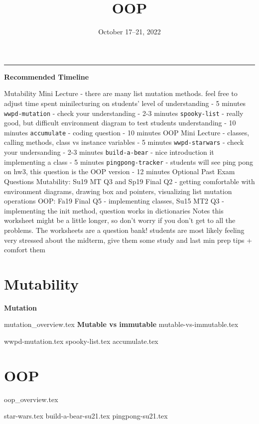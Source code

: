 \documentclass{exam}
\title{\textsc{OOP}}
\date{October 17--21, 2022}
\begin{document}
	\maketitle
	\rule{\textwidth}{0.15em}
	\fontsize{12}{15}\selectfont

\begin{guide}
	\textbf{Recommended Timeline}
	\begin{outline}[enumerate]
		\1 Mutability Mini Lecture - there are many list mutation methods. feel free to adjust time spent minilecturing on students' level of understanding - 5 minutes
		\1 \lstinline{wwpd-mutation} - check your understanding - 2-3 minutes
		\1 \lstinline{spooky-list} - really good, but difficult environment diagram to test students understanding - 10 minutes
		\1 \lstinline{accumulate} - coding question - 10 minutes
		\1 OOP Mini Lecture - classes, calling methods, class vs instance variables - 5 minutes
		\1 \lstinline{wwpd-starwars} - check your undersanding - 2-3 minutes
		\1 \lstinline{build-a-bear} - nice introduction it implementing a class - 5 minutes 
		\1 \lstinline{pingpong-tracker} - students will see ping pong on hw3, this question is the OOP version - 12 minutes
		\1 Optional Past Exam Questions
		\2 Mutability: Su19 MT Q3 and Sp19 Final Q2 - getting comfortable with environment diagrams, drawing box and pointers, visualizing list mutation operations
		\2 OOP: Fa19 Final Q5 - implementing classes, Su15 MT2 Q3 - implementing the init method, question works in dictionaries
		\1 Notes
		\2 this worksheet might be a little longer, so don't worry if you don't get to all the problems. The worksheets are a question bank!
		\2 students are most likely feeling very stressed about the midterm, give them some study and last min prep tips + comfort them
	\end{outline}
\end{guide}

\section{Mutability}
\textbf{Mutation}

{mutation_overview.tex}
\textbf{Mutable vs immutable}
{mutable-vs-immutable.tex}
\begin{questions}
{wwpd-mutation.tex}
\newpage
{spooky-list.tex}
\newpage
{accumulate.tex}
\end{questions}

\newpage
\section{OOP}
{oop_overview.tex}
\newpage
\begin{questions}
{star-wars.tex}
\newpage
{build-a-bear-su21.tex}
{pingpong-su21.tex}
\end{questions}
\end{document}
